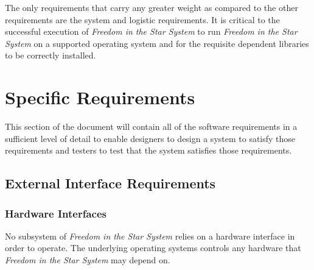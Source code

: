 \documentclass[twoside,letterpaper]{article}
\begin{document}
The only requirements that carry any greater weight as compared to the other requirements are the system and logistic requirements.  It is critical to the successful execution of \textit{Freedom in the Star System} to run \textit{Freedom in the Star System} on a supported operating system and for the requisite dependent libraries to be correctly installed.

\section{Specific Requirements}
This section of the document will contain all of the software requirements in a sufficient level of detail to enable designers to design a system to satisfy those requirements and testers to test that the system satisfies those requirements.

\subsection{External Interface Requirements}

\subsubsection{Hardware Interfaces}
No subsystem of \textit{Freedom in the Star System} relies on a hardware interface in order to operate.  The underlying operating systems controls any hardware that \textit{Freedom in the Star System} may depend on.
\end{document}
